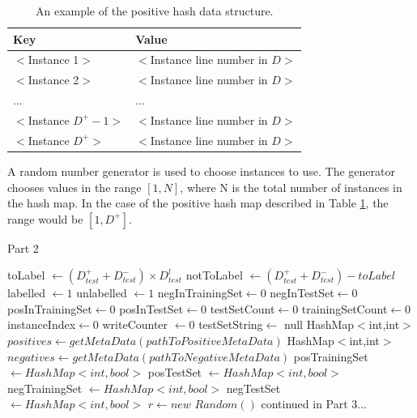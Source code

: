 \documentclass[twoside,a4paper]{refart}
\begin{document}
\begin{table}[!htp]
\centering
\footnotesize
    \begin{tabular}{|l|l|}
    \hline
    Key & Value \\ \hline
    $<$Instance 1$>$ & $<$Instance line number in $D>$  \\
    $<$Instance 2$>$ & $<$Instance line number in $D>$  \\
    ... & ... \\
    $<$Instance $D^{+}-1>$ & $<$Instance line number in $D>$ \\
    $<$Instance $D^{+}>$ & $<$Instance line number in $D>$ \\\hline
    \end{tabular}
     \caption[An example of the positive hash data structure.]{An example of the positive hash data structure.}
     \label{tab:hashmapabstract}
\end{table}
\newpage
A random number generator is used to choose instances to use. The generator chooses values in the range $[1,N]$, where N is the total number of instances in the hash map. In the case of the positive hash map described in Table \ref{tab:hashmapabstract}, the range would be  $[1,D^{+}]$.
\begin{algorithm}[!h]
\small
\caption{Part 2}
\begin{algorithmic}[1]
\State toLabel $\leftarrow (D_{test}^{+}+D_{test}^{-}) \times D_{test}^{l}$
\State notToLabel $\leftarrow (D_{test}^{+}+D_{test}^{-}) - toLabel$
\State labelled $\leftarrow 1$
\State unlabelled $\leftarrow 1$
\State negInTrainingSet$\leftarrow 0$
\State negInTestSet$\leftarrow 0$
\State posInTrainingSet$\leftarrow 0$
\State posInTestSet$\leftarrow 0$
\State testSetCount$\leftarrow 0$
\State trainingSetCount$\leftarrow 0$
\State instanceIndex$\leftarrow 0$
\State writeCounter $\leftarrow 0$
\State testSetString$\leftarrow$ null
\State HashMap$<$int,int$>$ $positives \leftarrow getMetaData(pathToPositiveMetaData)$
\State HashMap$<$int,int$>$ $negatives \leftarrow getMetaData(pathToNegativeMetaData)$
\State posTrainingSet $\leftarrow HashMap<int,bool>$
\State posTestSet $\leftarrow HashMap<int,bool>$
\State negTrainingSet $\leftarrow HashMap<int,bool>$
\State negTestSet $\leftarrow HashMap<int,bool>$
\State $r \leftarrow new$ $Random()$
\State \Comment continued in Part 3...
\end{algorithmic}
\end{algorithm}
\end{document}
